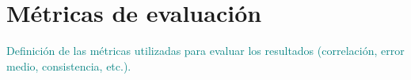 \section{Métricas de evaluación}
\textcolor{teal}{Definición de las métricas utilizadas para evaluar los resultados (correlación, error medio, consistencia, etc.).}
